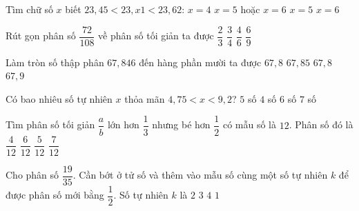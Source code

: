 \begin{ex} %
Tìm chữ số $x$ biết $23{,}45 < 23{,}x1 < 23{,}62$:
\choice
{$x = 4$}
{\True $x = 5$ hoặc $x = 6$}
{$x = 5$}
{$x = 6$}
\end{ex}

\begin{ex} %
Rút gọn phân số $\dfrac{72}{108}$ về phân số tối giản ta được
\choice
{\True $\dfrac{2}{3}$}
{$\dfrac{3}{4}$}
{$\dfrac{4}{6}$}
{$\dfrac{6}{9}$}
\end{ex}

\begin{ex} %
Làm tròn số thập phân $67{,}846$ đến hàng phần mười ta được
\choice
{$67{,}8$}
{$67{,}85$}
{\True $67{,}8$}
{$67{,}9$}
\end{ex}

\begin{ex} %
Có bao nhiêu số tự nhiên $x$ thỏa mãn $4{,}75 < x < 9{,}2$?
\choice
{\True $5$ số}
{$4$ số}
{$6$ số}
{$7$ số}
\end{ex}

\begin{ex} %
Tìm phân số tối giản $\dfrac{a}{b}$ lớn hơn $\dfrac{1}{3}$ nhưng bé hơn $\dfrac{1}{2}$ có mẫu số là $12$. Phân số đó là
\choice
{$\dfrac{4}{12}$}
{$\dfrac{6}{12}$}
{\True $\dfrac{5}{12}$}
{$\dfrac{7}{12}$}
\end{ex}

\begin{ex} %
Cho phân số $\dfrac{19}{35}$. Cần bớt ở tử số và thêm vào mẫu số cùng một số tự nhiên $k$ để được phân số mới bằng $\dfrac{1}{2}$. Số tự nhiên $k$ là
\choice
{$2$}
{$3$}
{$4$}
{\True $1$}
\end{ex}


